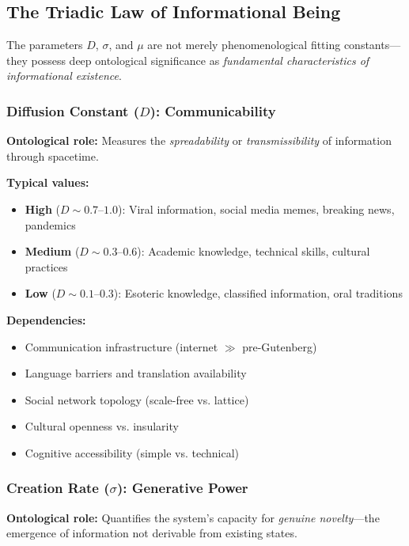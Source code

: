 \documentclass[12pt]{article}
\begin{document}
\subsection{The Triadic Law of Informational Being}

The parameters $D$, $\sigma$, and $\mu$ are not merely phenomenological fitting constants---they possess deep ontological significance as \emph{fundamental characteristics of informational existence}.

\subsubsection{Diffusion Constant ($D$): Communicability}

\textbf{Ontological role:} Measures the \emph{spreadability} or \emph{transmissibility} of information through spacetime.

\textbf{Typical values:}
\begin{itemize}
    \item \textbf{High} ($D \sim 0.7$--$1.0$): Viral information, social media memes, breaking news, pandemics
    \item \textbf{Medium} ($D \sim 0.3$--$0.6$): Academic knowledge, technical skills, cultural practices
    \item \textbf{Low} ($D \sim 0.1$--$0.3$): Esoteric knowledge, classified information, oral traditions
\end{itemize}

\textbf{Dependencies:}
\begin{itemize}
    \item Communication infrastructure (internet $\gg$ pre-Gutenberg)
    \item Language barriers and translation availability
    \item Social network topology (scale-free vs. lattice)
    \item Cultural openness vs. insularity
    \item Cognitive accessibility (simple vs. technical)
\end{itemize}

\subsubsection{Creation Rate ($\sigma$): Generative Power}

\textbf{Ontological role:} Quantifies the system's capacity for \emph{genuine novelty}---the emergence of information not derivable from existing states.
\end{document}
